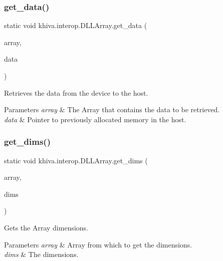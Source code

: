 \subsubsection{\texorpdfstring{get\+\_\+data()}{get\_data()}}
{\footnotesize\ttfamily static void khiva.\+interop.\+D\+L\+L\+Array.\+get\+\_\+data (\begin{DoxyParamCaption}\item[{\mbox{[}\+In\mbox{]} ref Int\+Ptr}]{array,  }\item[{\mbox{[}\+In, Out\mbox{]} Int\+Ptr}]{data }\end{DoxyParamCaption})\hspace{0.3cm}{\ttfamily [static]}}



Retrieves the data from the device to the host. 


\begin{DoxyParams}{Parameters}
{\em array} & The Array that contains the data to be retrieved.\\
\hline
{\em data} & Pointer to previously allocated memory in the host.\\
\hline
\end{DoxyParams}
\mbox{\label{classkhiva_1_1interop_1_1_d_l_l_array_a92cd10bd1187d836be00d5ded15b4854}} 
\subsubsection{\texorpdfstring{get\+\_\+dims()}{get\_dims()}}
{\footnotesize\ttfamily static void khiva.\+interop.\+D\+L\+L\+Array.\+get\+\_\+dims (\begin{DoxyParamCaption}\item[{\mbox{[}\+In\mbox{]} ref Int\+Ptr}]{array,  }\item[{\mbox{[}\+Out\mbox{]} long \mbox{[}$\,$\mbox{]}}]{dims }\end{DoxyParamCaption})\hspace{0.3cm}{\ttfamily [static]}}



Gets the Array dimensions. 


\begin{DoxyParams}{Parameters}
{\em array} & Array from which to get the dimensions.\\
\hline
{\em dims} & The dimensions.\\
\hline
\end{DoxyParams}
\mbox{\label{classkhiva_1_1interop_1_1_d_l_l_array_afbcddd8c8ef3c095cb1d37366f6012a7}} 

